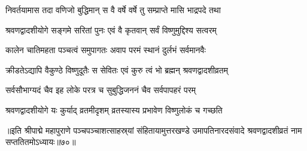 \twolineshloka
{निवर्तयामास तदा वणिजो बुद्धिमान् स वै}
{वर्षे वर्षे तु सम्प्राप्ते मासि भाद्रपदे तथा}%

\twolineshloka
{श्रवणद्वादशीयोगे सङ्गमे सरितां पुनः}
{एवं वै कृतवान् सर्वं विष्णुमुद्दिश्य सत्वरम्}%

\twolineshloka
{कालेन चातिमहता पञ्चत्वं समुपागतः}
{अवाप परमं स्थानं दुर्लभं सर्वमानवैः}%

\twolineshloka
{क्रीडतेऽद्यापि वैकुण्ठे विष्णुदूतैः स सेवितः}
{एवं कुरु त्वं भो ब्रह्मन् श्रवणद्वादशीव्रतम्}%

\twolineshloka
{सर्वसौभाग्यदं चैव इह लोके परत्र च}
{सुबुद्धिजननं चैव सर्वपापहरं परम्}%

\twolineshloka
{श्रवणद्वादशीयोगे यः कुर्याद् व्रतमीदृशम्}
{व्रतस्यास्य प्रभावेण विष्णुलोकं च गच्छति}%

॥इति श्रीपाद्मे महापुराणे पञ्चपञ्चाशत्साहस्र्यां संहितायामुत्तरखण्डे उमापतिनारदसंवादे श्रवणद्वादशीव्रतं नाम सप्ततितमोऽध्यायः॥७०॥

\genMangalaShloka

\hyperref[sec:ekadashi_mahatmyam_padma_puranam]{\closesub}

\clearpage